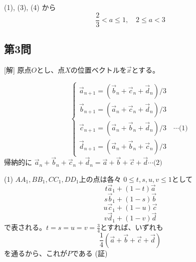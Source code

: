 \documentclass[../main.tex]{subfiles}
\begin{document}
(1), (3), (4) から
$$ \frac{2}{3} < a \le 1, \quad 2 \le a < 3 $$

\subsection*{第3問}
[解] 原点$O$とし、点$X$の位置ベクトルを$\vec{x}$とする。

\begin{minipage}{0.5\textwidth}
  $$
  \begin{cases}
    \vec{a}_{n+1} = (\vec{b}_n + \vec{c}_n + \vec{d}_n) / 3 \\
    \vec{b}_{n+1} = (\vec{a}_n + \vec{c}_n + \vec{d}_n) / 3 \\
    \vec{c}_{n+1} = (\vec{a}_n + \vec{b}_n + \vec{d}_n) / 3 \quad \cdots \text{(1)} \\
    \vec{d}_{n+1} = (\vec{a}_n + \vec{b}_n + \vec{c}_n) / 3
  \end{cases} $$
  帰納的に
  $\vec{a}_n + \vec{b}_n + \vec{c}_n + \vec{d}_n = \vec{a} + \vec{b} + \vec{c} + \vec{d} \cdots \text{(2)}$
\end{minipage}
\begin{minipage}{0.4\textwidth}
  \begin{center}
  \end{center}
\end{minipage}

(1) $AA_1, BB_1, CC_1, DD_1$上の点は各々 $0 \le t, s, u, v \le 1$として
$$ t \vec{a}_1 + (1-t) \vec{a} $$
$$ s \vec{b}_1 + (1-s) \vec{b} $$
$$ u \vec{c}_1 + (1-u) \vec{c} $$
$$ v \vec{d}_1 + (1-v) \vec{d} $$
で表される。$t=s=u=v=\frac{3}{4}$とすれば、いずれも
$$ \frac{1}{4} (\vec{a} + \vec{b} + \vec{c} + \vec{d}) $$
を通るから、これが$P$である (証)
\end{document}
